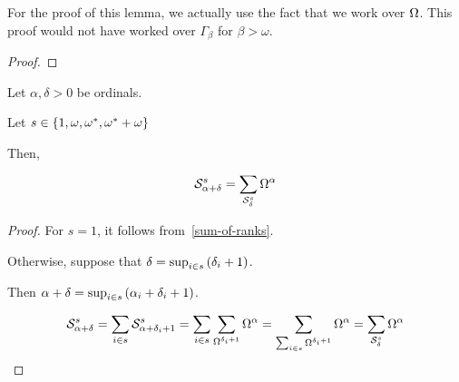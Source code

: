 \begin{note}
  For the proof of this lemma, we actually use the fact that
  we work over $\Omega$. This proof would not have worked over $\Gamma_{\beta}$
  for $\beta > \omega$.
\end{note}

\begin{proof}

\end{proof}

\begin{corollary}
  Let $\alpha, \delta > 0$ be ordinals.

  Let $s \in \left\{ {1, \omega, \omega^\ast, \omega^\ast + \omega} \right\}$

  Then,

  \[
    \mathcal{S}^{s}_{\alpha + \delta}
    = \sum_{\mathcal{S}^{s}_{\delta}}{\Omega^{\alpha}}
  \]
\end{corollary}

\begin{proof}

  For $s = 1$, it follows from~\cref{sum-of-ranks}.

  Otherwise, suppose that $\delta = \sup_{i \in s} \left( {\delta_i + 1} \right)$.

  Then $\alpha + \delta = \sup_{i \in s} \left( {\alpha_i + \delta_i + 1} \right)$.

  \[
    \mathcal{S}^{s}_{\alpha + \delta}
    = \sum_{i \in s}{\mathcal{S}^{s}_{\alpha + \delta_i + 1}}
    = \sum_{i \in s}\sum_{\Omega^{\delta_i + 1}}{\Omega^{\alpha}}
    = \sum_{\sum_{i \in s}{\Omega^{\delta_i + 1}}}{\Omega^{\alpha}}
    = \sum_{\mathcal{S}^{s}_{\delta}}{\Omega^{\alpha}}
  \]
\end{proof}

